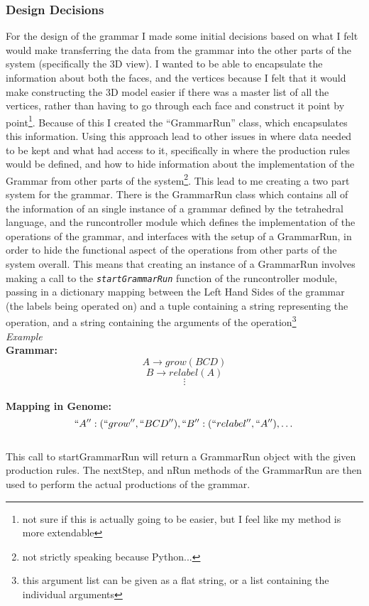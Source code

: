 \documentclass[letterpaper,oneside,titlepage]{article}
\begin{document}
\subsubsection*{Design Decisions}
For the design of the grammar I made some initial decisions based on what I felt would make transferring the data from the grammar into the other parts of the system (specifically the 3D view).  I wanted to be able to encapsulate the information about both the faces, and the vertices because I felt that it would make constructing the 3D model easier if there was a master list of all the vertices, rather than having to go through each face and construct it point by point\footnote{not sure if this is actually going to be easier, but I feel like my method is more extendable}.  Because of this I created the ``GrammarRun'' class, which encapsulates this information.  Using this approach lead to other issues in where data needed to be kept and what had access to it, specifically in where the production rules would be defined, and how to hide information about the implementation of the Grammar from other parts of the system\footnote{not strictly speaking because Python...}.  This lead to me creating a two part system for the grammar.  There is the GrammarRun class which contains all of the information of an single instance of a grammar defined by the tetrahedral language, and the runcontroller module which defines the implementation of the operations of the grammar, and interfaces with the setup of a GrammarRun, in order to hide the functional aspect of the operations from other parts of the system overall.  This means that creating an instance of a GrammarRun involves making a call to the \emph{\texttt{startGrammarRun}} function of the runcontroller module, passing in a dictionary mapping between the Left Hand Sides of the grammar (the labels being operated on) and a tuple containing a string representing the operation, and a string containing the arguments of the operation\footnote{this argument list can be given as a flat string, or a list containing the individual arguments}
\\
\emph{Example}
\\
\textbf{Grammar:}
\\
\[A \to grow(BCD)\]
\[B \to relabel(A)\]
\[\vdots\]
\\
\textbf{Mapping in Genome:}
\\
\[ ``A'' : (``grow'',``BCD''), ``B'' : (``relabel'',``A''), \dots  \]
\\
This call to startGrammarRun will return a GrammarRun object with the given production rules.  The nextStep, and nRun methods of the GrammarRun are then used to perform the actual productions of the grammar.
\end{document}
